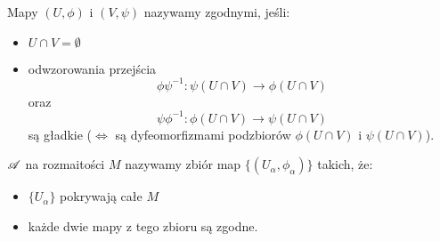   Mapy $(U, \phi)$ i $(V, \psi)$ nazywamy zgodnymi, jeśli:
  \begin{itemize}
    \item $U\cap V=\emptyset$
    \item odwzorowania przejścia 
      $$\phi\psi^{-1}:\psi(U\cap V)\to\phi(U\cap V)$$ 
      oraz 
      $$\psi\phi^{-1}:\phi(U\cap V)\to\psi(U\cap V)$$
      są gładkie ($\iff$ są dyfeomorfizmami podzbiorów $\phi(U\cap V)$ i $\psi(U\cap V)$).
  \end{itemize}

\begin{definition}
   $\mathcal{A}$ na rozmaitości $M$ nazywamy zbiór map $\{(U_\alpha, \phi_\alpha)\}$ takich, że:
  \begin{itemize}
    \item $\{U_\alpha\}$ pokrywają całe $M$
    \item każde dwie mapy z tego zbioru są zgodne.
  \end{itemize}
\end{definition}

